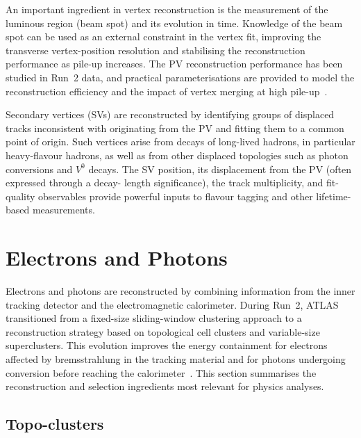 An important ingredient in vertex reconstruction is the measurement of the
luminous region (beam spot) and its evolution in time.
Knowledge of the beam spot can be used as an external constraint in the vertex
fit, improving the transverse vertex-position resolution and stabilising the
reconstruction performance as pile-up increases.
The PV reconstruction performance has been studied in Run~2 data, and practical
parameterisations are provided to model the reconstruction efficiency and the
impact of vertex merging at high pile-up~\cite{ATLASPrimaryVertices2017}.

Secondary vertices (SVs) are reconstructed by identifying groups of displaced
tracks inconsistent with originating from the PV and fitting them to a common
point of origin.
Such vertices arise from decays of long-lived hadrons, in particular heavy-flavour
hadrons, as well as from other displaced topologies such as photon conversions and
$V^0$ decays.
The SV position, its displacement from the PV (often expressed through a decay-
length significance), the track multiplicity, and fit-quality observables provide
powerful inputs to flavour tagging and other lifetime-based measurements.

\section{Electrons and Photons}

Electrons and photons are reconstructed by combining information from the inner
tracking detector and the electromagnetic calorimeter.
During Run~2, ATLAS transitioned from a fixed-size sliding-window clustering
approach to a reconstruction strategy based on topological cell clusters and
variable-size superclusters.
This evolution improves the energy containment for electrons affected by
bremsstrahlung in the tracking material and for photons undergoing conversion
before reaching the calorimeter~\cite{ATLASeGammaPerformance2019,ATLASegammaTopoSuperclusters2017}.
This section summarises the reconstruction and selection ingredients most relevant
for physics analyses.

\subsection{Topo-clusters}

